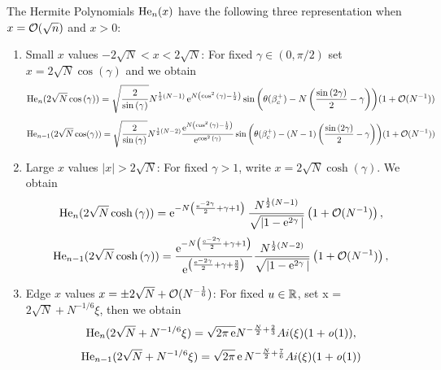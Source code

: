 \begin{thm}
The Hermite Polynomials $\mathrm{He}_n(x)$ have the following three representation when $x = \mathcal{O}(\sqrt{n})$ and $x > 0$:
\begin{enumerate}
	\item Small $x$ values $-2\sqrt{N} < x < 2\sqrt{N}$: For fixed $\gamma \in (0, \pi/2)$ set $x = 2\sqrt{N} \cos{(\gamma)}$ and we obtain
	 \begin{equation}
		\mathrm{He}_n(2\sqrt{N}\cos{(\gamma)}) = \sqrt{\frac{2}{\sin{(\gamma)}}}
		N^{\frac{1}{2} \left(N - 1\right)}
		\operatorname{e}^{N\left(\cos^2{(\gamma)} - \frac{1}{2} \right)} 
		\sin{
			\left(
			\theta(\beta_c^+) 
			-N\left(\frac{\sin{(2\gamma)}}{2}
			-\gamma\right)
			\right)
		} 
		(1 + \mathcal{O}(N^{-1}))
		\label{Eq: Hermite small asymptotic (n)}
	\end{equation}
	\begin{equation}
		\mathrm{He}_{n-1}(2\sqrt{N}\cos(\gamma)) = \sqrt{\frac{2}{\sin{(\gamma)}}}
		N^{\frac{1}{2} \left(N -2\right)}
		\frac{\operatorname{e}^{N\left(\cos^2{(\gamma)} - \frac{1}{2} \right)}}{\operatorname{e}^{\cos^2{(\gamma)}}}
		\sin{
			\left(
			\theta(\beta_c^+) 
			-(N-1)\left(\frac{\sin{(2\gamma)}}{2}
			-\gamma\right)
			\right)
		} 
		(1 + \mathcal{O}(N^{-1}))
		\label{Eq: Hermite small asymptotic (n-1)}
	\end{equation}
	\item Large $x$ values $|x| > 2\sqrt{N}$: For fixed $\gamma > 1$, write $x = 2\sqrt{N} \cosh{(\gamma)}$. We obtain
	\begin{equation}
		\mathrm{He}_n(2\sqrt{N}\cosh{(\gamma)}) = \operatorname{e}^{-N\left( \frac{\operatorname{e}^{-2\gamma}}{2} + \gamma +  1\right)} \frac{N^{\frac{1}{2}\left(N - 1\right)}}{\sqrt{|1 - \operatorname{e}^{2\gamma}|}} 
		\left(1 + \mathcal{O}(N^{-1}) \right),
		\label{Eq: Hermite large asymptotic (n)}
	\end{equation}
	\begin{equation}
		\mathrm{He}_{n-1}(2\sqrt{N}\cosh{(\gamma)}) = \frac{\operatorname{e}^{-N\left( \frac{\operatorname{e}^{-2\gamma}}{2} + \gamma +  1\right)}}{\operatorname{e}^{\left( \frac{\operatorname{e}^{-2\gamma}}{2} + \gamma + \frac{3}{2}\right)}} \frac{N^{\frac{1}{2}\left(N -2\right)}}{\sqrt{|1 - \operatorname{e}^{2\gamma}|}} \left(1 + \mathcal{O}(N^{-1}) \right),
		\label{Eq: Hermite large asymptotic (n-1)}
	\end{equation}
	\item Edge $x$ values $x = \pm 2\sqrt{N} + \mathcal{O}(N^{-\frac{1}{6}})$: For fixed $u \in \mathbb{R}$, set x = $2\sqrt{N} + N^{-1/6}\xi$, then we obtain
	\begin{equation}
		\mathrm{He}_n(2\sqrt{N} + N^{-1/6}\xi) = \sqrt{2\pi\operatorname{e}} N^{-\frac{N}{2} + \frac{2}{3}}  Ai(\xi) (1 + \mathit{o}(1)),
		\label{Eq: Hermite edge asymptotic (n)}
	\end{equation}
		\begin{equation}
		\mathrm{He}_{n-1}(2\sqrt{N} + N^{-1/6}\xi) = \sqrt{2\pi} \operatorname{e} N^{-\frac{N}{2} + \frac{7}{6}}  Ai(\xi) (1 + \mathit{o}(1))
		\label{Eq: Hermite edge asymptotic (n-1)}
	\end{equation}
\end{enumerate}
\end{thm}

